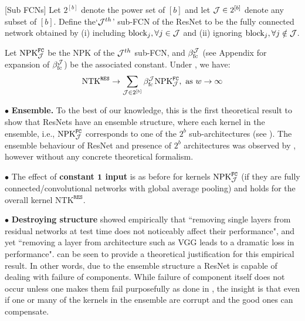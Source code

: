 \begin{definition}\label{def:subfcdnn}[Sub FCNs]
Let $2^{[b]}$ denote the power set of $[b]$ and let $\mathcal{J}\in 2^{[b]}$ denote any subset of $[b]$. Define the`$\mathcal{J}^{th}$' sub-FCN of the ResNet to be the fully connected network obtained by (i) including  $\text{block}_{j},\forall j\in \mathcal{J}$  and (ii) ignoring $\text{block}_{j},\forall j\notin \mathcal{J}$. %
\end{definition}
\begin{theorem}\label{th:res} 
Let $\text{NPK}^{\texttt{FC}}_{\mathcal{J}}$ be the NPK of the $\mathcal{J}^{th}$ sub-FCN, and $\beta_{\text{fc}}^{\mathcal{J}}$ (see Appendix for expansion of $\beta_{\text{fc}}^{\mathcal{J}}$) be the associated constant. Under , we have:
\begin{align*}
\text{NTK}^{\texttt{RES}}\rightarrow \sum_{\mathcal{J}\in 2^{[b]}}  \beta_{\text{fc}}^{\mathcal{J}} \text{NPK}^{\texttt{FC}}_{\mathcal{J}}, \,\, \text{as}\,\,  w\rightarrow\infty
\end{align*}
\end{theorem}
$\bullet$ \textbf{Ensemble.} To the best of our knowledge, this is the first theoretical result to show that ResNets have an ensemble structure, where  each kernel in the ensemble, i.e., $\text{NPK}^{\texttt{FC}}_{\mathcal{J}}$ corresponds to one of the $2^b$ sub-architectures (see ). The ensemble behaviour of ResNet and  presence of $2^b$ architectures was observed by \cite{veit2016residual}, however without any concrete theoretical formalism. 

$\bullet$ The effect of \textbf{constant $\mathbf{1}$ input} is as before for kernels $\text{NPK}^{\texttt{FC}}_{\mathcal{J}}$ (if they are fully connected/convolutional networks with global average pooling) and holds for the overall kernel $\text{NTK}^{\texttt{RES}}$.

$\bullet$ \textbf{Destroying structure} \cite{veit2016residual} showed empirically that ``removing single layers from residual networks at test time does not noticeably affect their performance", and yet ``removing a layer from architecture such as VGG leads to a dramatic loss in performance".  can be seen to provide a theoretical justification for this empirical result. In other words, due to the ensemble structure a ResNet is capable of dealing with failure of components. While failure of component itself does not occur unless one makes them fail purposefully as done in \citep{veit2016residual},  the insight is that even if one or many of the kernels in the ensemble are corrupt and the good ones can compensate.%


